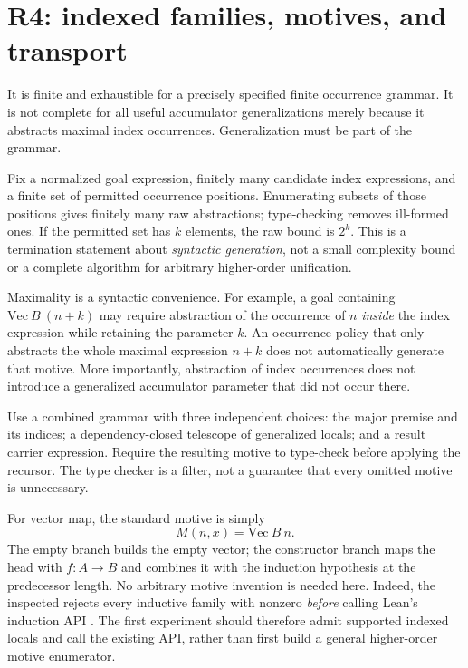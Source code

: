 \section{R4: indexed families, motives, and transport}
\label{sec:dependent}

\ans It is finite and exhaustible for a precisely specified finite occurrence grammar. It is not complete for all useful accumulator generalizations merely because it abstracts maximal index occurrences. Generalization must be part of the grammar.

Fix a normalized goal expression, finitely many candidate index expressions, and a finite set of permitted occurrence positions. Enumerating subsets of those positions gives finitely many raw abstractions; type-checking removes ill-formed ones. If the permitted set has $k$ elements, the raw bound is $2^k$. This is a termination statement about \emph{syntactic generation}, not a small complexity bound or a complete algorithm for arbitrary higher-order unification.

Maximality is a syntactic convenience. For example, a goal containing $\mathrm{Vec}\ B\ (n+k)$ may require abstraction of the occurrence of $n$ \emph{inside} the index expression while retaining the parameter $k$. An occurrence policy that only abstracts the whole maximal expression $n+k$ does not automatically generate that motive. More importantly, abstraction of index occurrences does not introduce a generalized accumulator parameter that did not occur there.

Use a combined grammar with three independent choices: the major premise and its indices; a dependency-closed telescope of generalized locals; and a result carrier expression. Require the resulting motive to type-check before applying the recursor. The type checker is a filter, not a guarantee that every omitted motive is unnecessary.

For vector map, the standard motive is simply
\[
  M(n,x)=\mathrm{Vec}\ B\ n.
\]
The empty branch builds the empty vector; the constructor branch maps the head with $f:A\to B$ and combines it with the induction hypothesis at the predecessor length. No arbitrary motive invention is needed here. Indeed, the inspected  rejects every inductive family with nonzero  \emph{before} calling Lean's induction API \cite{searchcore}. The first experiment should therefore admit supported indexed locals and call the existing API, rather than first build a general higher-order motive enumerator.

